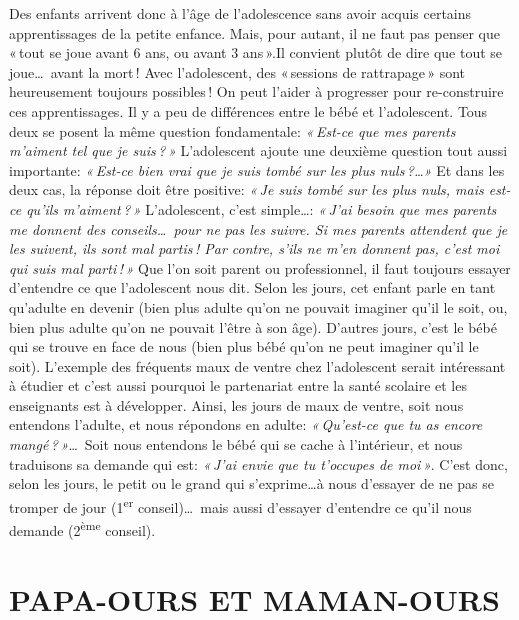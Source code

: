 \documentclass[11pt]{article} %
\begin{document}
  Des enfants arrivent donc à l'âge de l'adolescence sans avoir acquis certains apprentissages de la petite enfance. Mais, pour autant, il ne faut pas penser que « tout se joue avant 6 ans, ou avant 3 ans ».Il convient plutôt de dire que tout se joue\dots\ avant la mort !\newline
  Avec l'adolescent, des « sessions de rattrapage » sont heureusement toujours possibles ! On peut l'aider à progresser pour re-construire ces apprentissages.\newline
  Il y a peu de différences entre le bébé et l'adolescent. Tous deux se posent la même question fondamentale: \textit{« Est-ce que mes parents m'aiment tel que je suis ? »} L'adolescent ajoute une deuxième question tout aussi importante: \textit{« Est-ce bien vrai que je suis tombé sur les plus nuls ?\dots »} Et dans les deux cas, la réponse doit être positive: \textit{« Je suis tombé sur les plus nuls, mais est-ce qu'ils m'aiment ? »} L'adolescent, c'est simple\dots: \textit{« J'ai besoin que mes parents me donnent des conseils\dots\ pour ne pas les suivre. Si mes parents attendent que je les suivent, ils sont mal partis ! Par contre, s'ils ne m'en donnent pas, c'est moi qui suis mal parti ! »}\newline
  Que l'on soit parent ou professionnel, il faut toujours essayer d'entendre ce que l'adolescent nous dit. Selon les jours, cet enfant parle en tant qu'adulte en devenir (bien plus adulte qu'on ne pouvait imaginer qu'il le soit, ou, bien plus adulte qu'on ne pouvait l'être à son âge). D'autres jours, c'est le bébé qui se trouve en face de nous (bien plus bébé qu'on ne peut imaginer qu'il le soit).\newline
  L'exemple des fréquents maux de ventre chez l'adolescent serait intéressant à étudier et c'est aussi pourquoi le partenariat entre la santé scolaire et les enseignants est à développer. Ainsi, les jours de maux de ventre, soit nous entendons l'adulte, et nous répondons en adulte: \textit{« Qu'est-ce que tu as encore mangé ? »}\dots\ Soit nous entendons le bébé qui se cache à l'intérieur, et nous traduisons sa demande qui est: \textit{« J'ai envie que tu t'occupes de moi »}. C'est donc, selon les jours, le petit ou le grand qui s'exprime\dots à nous d'essayer de ne pas se tromper de jour (1\textsuperscript{er} conseil)\dots\ mais aussi d'essayer d'entendre ce qu'il nous demande (2\textsuperscript{ème} conseil).


\section{PAPA-OURS ET MAMAN-OURS}
\end{document}
